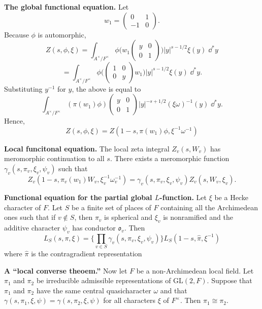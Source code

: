 \documentclass[12pt, letterpaper, twoside]
{article}
\newcommand{\dd}[1]{\mathrm{d}#1} %
\newcommand{\GL}{{\text{GL}}} %
\newcommand{\oI}{\mathfrak{o}} %
\begin{document}
\textbf{The global functional equation.} Let
\[w_1 = \begin{pmatrix} 0 & 1 \\ -1 & 0 \end{pmatrix}.\] Because $\phi$ is
automorphic,
\[Z(s, \phi, \xi) = \int_{A^\times/F^\times} \phi \bigg( w_1 \begin{pmatrix} y &
0 \\ 0 & 1 \end{pmatrix}\bigg) |y|^{s - 1/2} \xi(y) \; \dd^* y\]
\[= \int_{A^\times/F^\times} \phi \bigg( \begin{pmatrix} 1 & 0 \\ 0 & y
\end{pmatrix} w_1\bigg) |y|^{s - 1/2} \xi(y) \; \dd^* y.\] Substituting $y^{-1}$
for $y$, the above is equal to
\[\int_{A^\times/F^\times} (\pi(w_1)\phi) \begin{pmatrix} y & 0 \\ 0 & 1
\end{pmatrix} |y|^{-s + 1/2} (\xi\omega)^{-1}(y) \; \dd^* y.\] Hence,
\[Z(s, \phi, \xi) = Z(1 - s, \pi(w_1)\phi, \xi^{-1}\omega^{-1})\]


\textbf{Local funcitonal equation.} The local zeta integral $Z_v(s, W_v)$ has
meromorphic continuation to all $s$. There exists a meromorphic function
$\gamma_v(s, \pi_v, \xi_v, \psi_v)$ such that
\[Z_v(1 - s, \pi_v(w_1)W_v, \xi_v^{-1}\omega_v^{-1}) = \gamma_v(s, \pi_v, \xi_v,
\psi_v) Z_v(s, W_v, \xi_v).\]

\textbf{Functional equation for the partial global $L$-function.} Let $\xi$ be a
Hecke character of $F$. Let $S$ be a finite set of places of $F$ containing all
the Archimedean ones such that if $v \not\in S$, then $\pi_v$ is spherical and
$\xi_v$ is nonramified and the additive character $\psi_v$ has conductor
$\oI_v$. Then
\[L_S(s, \pi, \xi) = \bigg\{ \prod_{v \in S} \gamma_v(s, \pi_v, \xi_v, \psi_v)
\bigg\} L_S(1 - s, \hat{\pi}, \xi^{-1})\] where $\hat{\pi}$ is the
contragradient representation

\textbf{A ``local converse theoem.''} Now let $F$ be a non-Archimedean local
field. Let $\pi_1$ and $\pi_2$ be irreducible admissible representations of
$\GL(2, F)$. Suppose that $\pi_1$ and $\pi_2$ have the same central
quasicharacter $\omega$ and that $\gamma(s, \pi_1, \xi, \psi) = \gamma(s, \pi_2,
\xi, \psi)$ for all characters $\xi$ of $F^\times$. Then $\pi_1 \cong \pi_2$.
\end{document}
